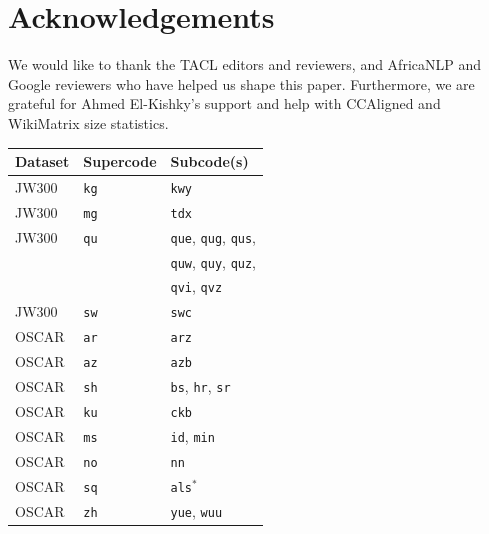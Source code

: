\section*{Acknowledgements}
We would like to thank the TACL editors and reviewers, and AfricaNLP and Google reviewers who have helped us shape this paper. Furthermore, we are grateful for Ahmed El-Kishky's support and help with CCAligned and WikiMatrix size statistics.



\begin{table}[th!]
    \centering
    \begin{tabular}{lll}
        \toprule
        \textbf{Dataset } & \textbf{Supercode} & \textbf{Subcode(s)}                       \\
        \midrule
        JW300             & \texttt{kg}        & \texttt{kwy}                              \\
        JW300             & \texttt{mg}        & \texttt{tdx}                              \\
        JW300             & \texttt{qu}        & \texttt{que}, \texttt{qug}, \texttt{qus}, \\
                          &                    & \texttt{quw}, \texttt{quy}, \texttt{quz}, \\
                          &                    & \texttt{qvi}, \texttt{qvz}                \\
        JW300             & \texttt{sw}        & \texttt{swc}                              \\
        \midrule
        OSCAR             & \texttt{ar}        & \texttt{arz}                              \\
        OSCAR             & \texttt{az}        & \texttt{azb}                              \\
        OSCAR             & \texttt{sh}        & \texttt{bs}, \texttt{hr}, \texttt{sr}     \\
        OSCAR             & \texttt{ku}        & \texttt{ckb}                              \\
        OSCAR             & \texttt{ms}        & \texttt{id}, \texttt{min}                 \\
        OSCAR             & \texttt{no}        & \texttt{nn}                               \\
        OSCAR             & \texttt{sq}        & \texttt{als}$^{*}$                        \\
        OSCAR             & \texttt{zh}        & \texttt{yue}, \texttt{wuu}                \\

\end{tabular}
\end{table}
